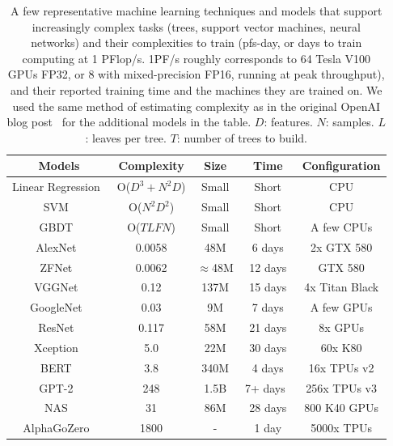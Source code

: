 \begin{table}
\centering
\begin{tabular}{|c|c|c|c|c|}
  \hline
  Models & Complexity & Size & Time & Configuration \\
  \hline
  Linear Regression~\cite{seber2012linear} & O($D^3+ N^2D$) & Small & Short & CPU \\
  \hline
  SVM~\cite{wang2005support} & O($N^2D^2$) & Small & Short & CPU \\
  \hline
  GBDT~\cite{friedman2001greedy} & O($TLFN$) & Small & Short & A few CPUs \\
  \hline
  \hline 
  AlexNet~\cite{alexnet}   & 0.0058 & 48M & 6 days  & 2x GTX 580\\
  \hline
  ZFNet~\cite{ZFNet}   & 0.0062  &  $\approx$48M  & 12 days  & GTX 580\\
  \hline
  VGGNet~\cite{VGGNet}   & 0.12  & 137M & 15 days & 4x Titan Black\\
  \hline
  GoogleNet~\cite{GoogleNet}   & 0.03  & 9M & 7 days & A few GPUs\\
  \hline
  ResNet~\cite{RESNET}   & 0.117 &  58M & 21 days & 8x GPUs\\
  \hline
  Xception~\cite{Chollet_2017}  & 5.0  & 22M & 30 days & 60x K80\\
  \hline
  \hline
  BERT~\cite{bert}  & 3.8 & 340M & 4 days & 16x TPUs v2 \\
  \hline
  GPT-2~\cite{GPT2}  & 248 & 1.5B & 7+ days~\cite{gpt2Time} & 256x TPUs v3 \\
  \hline
  \hline
  NAS~\cite{zoph2016neural}  & 31 & 86M & 28 days & 800 K40 GPUs\\
  \hline
  AlphaGoZero~\cite{silver2016mastering}  & 1800 & - & 1 day & 5000x TPUs \\
  \hline
\end{tabular}
\caption{A few representative machine learning techniques and models that support increasingly complex tasks (trees, support vector machines, neural networks) and their complexities to train (pfs-day, or days to train computing at 1 PFlop/s. 1PF/s roughly corresponds to 64 Tesla V100 GPUs FP32, or 8 with mixed-precision FP16, running at peak throughput), and their reported training time and the machines they are trained on. We used the same method of estimating complexity as in the original OpenAI blog post~\cite{AIandCom3:online} for the additional models in the table. $D$: features. $N$: samples. $L$: leaves per tree. $T$: number of trees to build.}
\label{table:trend}
\end{table}

